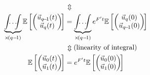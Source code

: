 {\begin{align*}
    \\
    &\hspace*{2mm}\rotatebox[origin=c]{90}{$\Leftrightarrow$}
    \\
    \underbrace{\int\!\!\!\dots\!\!\!\int}_{\times\! (q-\!1)} \mathbb{E}\left[\begin{pmatrix}
        \vec{u}_{q\!-\!1}(t) \\ \vec{u}_{q}(t)
    \end{pmatrix} \!\right] &= \underbrace{\int\!\!\!\dots\!\!\!\int}_{\times\! (q-\!1)} 
    e^{F^\prime t} \mathbb{E}\left[\begin{pmatrix}
        \vec{u}_{q}(0) \\ \vec{u}_{q\!-\!1}(0)
    \end{pmatrix} \!\right]
    \\
    &\hspace*{2mm}\rotatebox[origin=c]{90}{$\Leftrightarrow$} \text{  (linearity of integral)}
    \\
    \mathbb{E}\left[\begin{pmatrix}
        \vec{u}_{0}(t) \\ \vec{u}_{1}(t)
    \end{pmatrix} \!\right] &= 
    e^{F^\prime t} \mathbb{E}\left[\begin{pmatrix}
        \vec{u}_{0}(0) \\ \vec{u}_{1}(0)
    \end{pmatrix} \!\right]
\end{align*}
}

